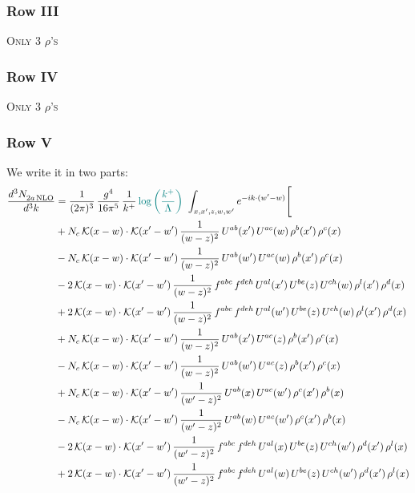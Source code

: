 \documentclass[9pt]{article}
\numberwithin{equation}{section}
\begin{document}
\subsubsection{Row III}
\textsc{Only 3 $\rho$'s}
\subsubsection{Row IV}
\textsc{Only 3 $\rho$'s}
\subsubsection{Row V}
We write it in two parts: 
\begin{align}
    \frac{d^{3}N_{2a\,\rm NLO}^{\rm}}{d^{3}k}  & = \frac{1}{(2\pi)^{3}}\,\frac{g^{4}}{16\pi^{5}}\,\frac{1}{k^{+}}\,{\color{teal}\log{\left(\frac{k^{+}}{\Lambda}\right)}}\,\,\int_{x,x',z,w,w'}e^{-ik\cdot(w'-w)}\Bigg[\notag\\
&+N_{c}\,\mathcal{K}(x-w)\cdot\mathcal{K}(x'-w')\,\frac{1}{(w-z)^{2}}\,U^{ab}(x')\,U^{ac}(w)\,\rho^{b}(x')\,\rho^{c}(x)\notag\\
&-N_{c}\,\mathcal{K}(x-w)\cdot\mathcal{K}(x'-w')\,\frac{1}{(w-z)^{2}}\,U^{ab}(w')\,U^{ac}(w)\,\rho^{b}(x')\,\rho^{c}(x)\notag\\
&-2\,\mathcal{K}(x-w)\cdot\mathcal{K}(x'-w')\,\frac{1}{(w-z)^{2}}\,f^{abc}\,f^{deh}\,U^{al}(x')\,U^{be}(z)\,U^{ch}(w)\,\rho^{l}(x')\,\rho^{d}(x)\notag\\
&+2\,\mathcal{K}(x-w)\cdot\mathcal{K}(x'-w')\,\frac{1}{(w-z)^{2}}\,f^{abc}\,f^{deh}\,U^{al}(w')\,U^{be}(z)\,U^{ch}(w)\,\rho^{l}(x')\,\rho^{d}(x)\notag\\
&+N_{c}\,\mathcal{K}(x-w)\cdot\mathcal{K}(x'-w')\,\frac{1}{(w-z)^{2}}\,U^{ab}(x')\,U^{ac}(z)\,\rho^{b}(x')\,\rho^{c}(x)\notag\\
&-N_{c}\,\mathcal{K}(x-w)\cdot\mathcal{K}(x'-w')\,\frac{1}{(w-z)^{2}}\,U^{ab}(w')\,U^{ac}(z)\,\rho^{b}(x')\,\rho^{c}(x)\notag\\
&+N_{c}\,\mathcal{K}(x-w)\cdot\mathcal{K}(x'-w')\,\frac{1}{(w'-z)^{2}}\,U^{ab}(x)\,U^{ac}(w')\,\rho^{c}(x')\,\rho^{b}(x)\notag\\
&-N_{c}\,\mathcal{K}(x-w)\cdot\mathcal{K}(x'-w')\,\frac{1}{(w'-z)^{2}}\,U^{ab}(w)\,U^{ac}(w')\,\rho^{c}(x')\,\rho^{b}(x)\notag\\
&-2\,\mathcal{K}(x-w)\cdot\mathcal{K}(x'-w')\,\frac{1}{(w'-z)^{2}}\,f^{abc}\,f^{deh}\,U^{al}(x)\,U^{be}(z)\,U^{ch}(w')\,\rho^{d}(x')\,\rho^{l}(x)\notag\\
&+2\,\mathcal{K}(x-w)\cdot\mathcal{K}(x'-w')\,\frac{1}{(w'-z)^{2}}\,f^{abc}\,f^{deh}\,U^{al}(w)\,U^{be}(z)\,U^{ch}(w')\,\rho^{d}(x')\,\rho^{l}(x)\notag\\

\end{align}
\end{document}
